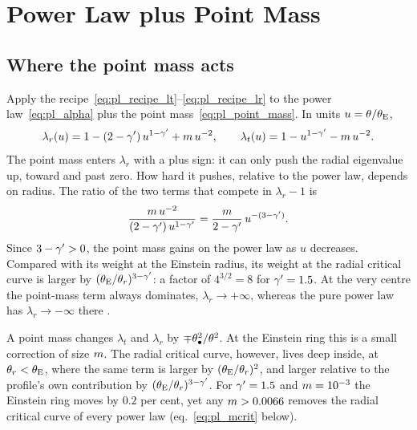 \section{Power Law plus Point Mass}
\label{sec:pl_plpm}

\subsection{Where the point mass acts}

Apply the recipe~\eqref{eq:pl_recipe_lt}--\eqref{eq:pl_recipe_lr} to
the power law~\eqref{eq:pl_alpha} plus the point
mass~\eqref{eq:pl_point_mass}.  In units $u=\theta/\theta_{\mathrm{E}}$,
\begin{equation}
    \lambda_r(u) = 1-(2-\gamma')\,u^{1-\gamma'}+m\,u^{-2} ,
    \qquad
    \lambda_t(u) = 1-u^{1-\gamma'}-m\,u^{-2} .
    \label{eq:pl_plpm_lambdas}
\end{equation}
The point mass enters $\lambda_r$ with a plus sign: it can only push
the radial eigenvalue up, toward and past zero.  How hard it pushes,
relative to the power law, depends on radius.  The ratio of the two
terms that compete in $\lambda_r-1$ is
\begin{equation}
    \frac{m\,u^{-2}}{(2-\gamma')\,u^{1-\gamma'}} = \frac{m}{2-\gamma'}\,u^{-(3-\gamma')} .
    \label{eq:pl_weight_ratio}
\end{equation}
Since $3-\gamma'>0$, the point mass gains on the power law as $u$
decreases.  Compared with its weight at the Einstein radius, its weight
at the radial critical curve is larger by $(\theta_{\mathrm{E}}/\theta_r)^{3-\gamma'}$:
a factor of $4^{3/2}=8$ for $\gamma'=1.5$.  At the very centre the
point-mass term always dominates, $\lambda_r\to+\infty$, whereas the pure
power law has $\lambda_r\to-\infty$ there .

\begin{keybox}
A point mass changes $\lambda_t$ and $\lambda_r$ by $\mp\theta_{\bullet}^2/\theta^2$.
At the Einstein ring this is a small correction of size $m$.  The
radial critical curve, however, lives deep inside, at
$\theta_r<\theta_{\mathrm{E}}$, where the same term is larger by
$(\theta_{\mathrm{E}}/\theta_r)^2$, and larger relative to the profile's own
contribution by $(\theta_{\mathrm{E}}/\theta_r)^{3-\gamma'}$.  For $\gamma'=1.5$ and
$m=10^{-3}$ the Einstein ring moves by $0.2$ per cent, yet any
$m>0.0066$ removes the radial critical curve of every power law
(eq.~\ref{eq:pl_mcrit} below).
\end{keybox}

